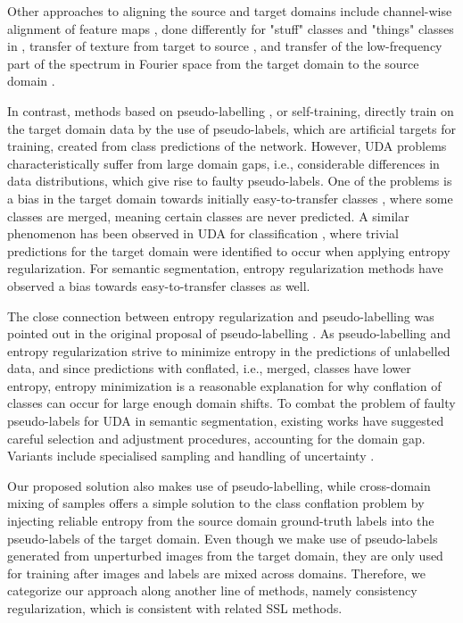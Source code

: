 \documentclass[10pt,twocolumn,letterpaper]{article}
\begin{document}
Other approaches to aligning the source and target domains include channel-wise alignment of feature maps \cite{wu2018dcan}, done differently for "stuff" classes and "things" classes in \cite{wang2020differential}, transfer of texture from target to source \cite{DBLP:conf/cvpr/KimB20a}, and transfer of the low-frequency part of the spectrum in Fourier space from the target domain to the source domain \cite{yang2020fda}.

\vspace{0.4cm}
 In contrast, methods based on pseudo-labelling \cite{pseudo-label}, or self-training, directly train on the target domain data by the use of pseudo-labels, which are artificial targets for training, created from class predictions of the network. However, UDA problems characteristically suffer from large domain gaps, i.e., considerable differences in data distributions, which give rise to faulty pseudo-labels. One of the problems is a bias in the target domain towards initially easy-to-transfer classes \cite{zou2018domain,zou2019confidence}, where some classes are merged, meaning certain classes are never predicted. A similar phenomenon has been observed in UDA for classification \cite{wu2020entropy}, where trivial predictions for the target domain were identified to occur when applying entropy regularization. For semantic segmentation, entropy regularization methods have observed a bias towards easy-to-transfer classes \cite{vu2018advent} as well. 

The close connection between entropy regularization and pseudo-labelling was pointed out in the original proposal of pseudo-labelling \cite{pseudo-label}. As pseudo-labelling and entropy regularization strive to minimize entropy in the predictions of unlabelled data, and since predictions with conflated, i.e., merged, classes have lower entropy, entropy minimization is a reasonable explanation for why conflation of classes can occur for large enough domain shifts. To combat the problem of faulty pseudo-labels for UDA in semantic segmentation, existing works have suggested careful selection and adjustment procedures, accounting for the domain gap. Variants include specialised sampling \cite{zou2018domain, DBLP:journals/corr/abs-2008-12197} and handling of uncertainty \cite{zou2019confidence,zheng2020rectifying}. 

Our proposed solution also makes use of pseudo-labelling, while cross-domain mixing of samples offers a simple solution to the class conflation problem by injecting reliable entropy from the source domain ground-truth labels into the pseudo-labels of the target domain. Even though we make use of pseudo-labels generated from unperturbed images from the target domain, they are only used for training after images and labels are mixed across domains. Therefore, we categorize our approach along another line of methods, namely consistency regularization, which is consistent with related SSL methods.
\end{document}
